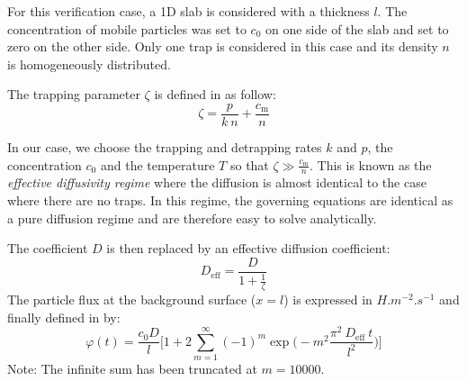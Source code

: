
For this verification case, a 1D slab is considered with a thickness $l$.
The concentration of mobile particles was set to $c_0$ on one side of the slab and set to zero on the other side.
Only one trap is considered in this case and its density $n$ is homogeneously distributed.

The trapping parameter $\zeta$ is defined in  as follow:
\begin{equation}
    \zeta = \frac{p}{k \: n} + \frac{c_\mathrm{m}}{n}
\end{equation}

In our case, we choose the trapping and detrapping rates $k$ and $p$, the concentration $c_0$ and the temperature $T$ so that $\zeta \gg \frac{c_\mathrm{m}}{n}$.
This is known as the \textit{effective diffusivity regime} where the diffusion is almost identical to the case where there are no traps.
In this regime, the governing equations are identical as a pure diffusion regime and are therefore easy to solve analytically.

The coefficient $D$ is then replaced by an effective diffusion coefficient:
\begin{equation}
    D_\mathrm{eff} = \frac{D}{1+\frac{1}{\zeta}}
\end{equation}
The particle flux at the background surface ($x=l$) is expressed in $\si{H.m^{-2}.s^{-1}}$ and finally defined in  by:
\begin{equation}
    \varphi(t) = \frac{c_0 D}{l}\bigg[1+2\sum_{m=1}^{\infty}(-1)^m \exp\bigg(-m^2\frac{\pi^2 \:D_\mathrm{eff} \: t}{l^2}\bigg)\bigg]
\label{eq:flux analytical}
\end{equation}
Note: The infinite sum has been truncated at $m=10000$.


